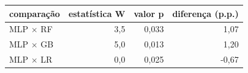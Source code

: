 
\begin{tabular}{lrrr}
\toprule
\textbf{comparação} & \textbf{estatística W} & \textbf{valor p} & \textbf{diferença (p.p.)} \\
\midrule
MLP $\times$ RF & 3,5 & 0{,}033 & 1,07 \\
MLP $\times$ GB & 5,0 & 0{,}013 & 1,20 \\
MLP $\times$ LR & 0,0 & 0{,}025 & -0,67 \\
\bottomrule
\end{tabular}
